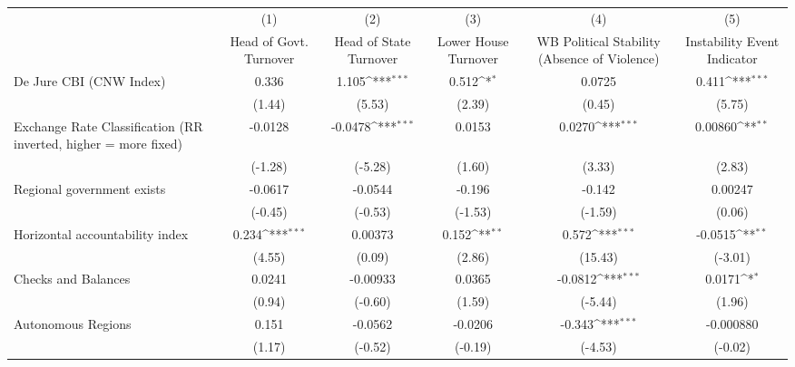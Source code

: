 {
\def\sym#1{\ifmmode^{#1}\else\(^{#1}\)\fi}
\begin{tabular*}{\linewidth}{@{\hskip\tabcolsep\extracolsep\fill}l*{5}{c}}
\toprule
                &\multicolumn{1}{c}{(1)}&\multicolumn{1}{c}{(2)}&\multicolumn{1}{c}{(3)}&\multicolumn{1}{c}{(4)}&\multicolumn{1}{c}{(5)}\\
                &\multicolumn{1}{c}{Head of Govt. Turnover}&\multicolumn{1}{c}{Head of State Turnover}&\multicolumn{1}{c}{Lower House Turnover}&\multicolumn{1}{c}{WB Political Stability (Absence of Violence)}&\multicolumn{1}{c}{Instability Event Indicator}\\
\midrule
De Jure CBI (CNW Index)&    0.336         &    1.105\sym{***}&    0.512\sym{*}  &   0.0725         &    0.411\sym{***}\\
                &   (1.44)         &   (5.53)         &   (2.39)         &   (0.45)         &   (5.75)         \\
\addlinespace
Exchange Rate Classification (RR inverted, higher = more fixed)&  -0.0128         &  -0.0478\sym{***}&   0.0153         &   0.0270\sym{***}&  0.00860\sym{**} \\
                &  (-1.28)         &  (-5.28)         &   (1.60)         &   (3.33)         &   (2.83)         \\
\addlinespace
Regional government exists   &  -0.0617         &  -0.0544         &   -0.196         &   -0.142         &  0.00247         \\
                &  (-0.45)         &  (-0.53)         &  (-1.53)         &  (-1.59)         &   (0.06)         \\
\addlinespace
Horizontal accountability index&    0.234\sym{***}&  0.00373         &    0.152\sym{**} &    0.572\sym{***}&  -0.0515\sym{**} \\
                &   (4.55)         &   (0.09)         &   (2.86)         &  (15.43)         &  (-3.01)         \\
\addlinespace
Checks and Balances&   0.0241         & -0.00933         &   0.0365         &  -0.0812\sym{***}&   0.0171\sym{*}  \\
                &   (0.94)         &  (-0.60)         &   (1.59)         &  (-5.44)         &   (1.96)         \\
\addlinespace
Autonomous Regions&    0.151         &  -0.0562         &  -0.0206         &   -0.343\sym{***}&-0.000880         \\
                &   (1.17)         &  (-0.52)         &  (-0.19)         &  (-4.53)         &  (-0.02)         \\

\end{tabular*}}
